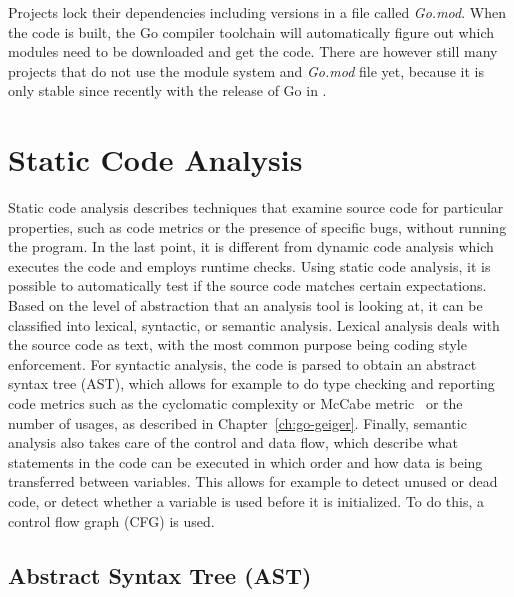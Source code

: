 

Projects lock their dependencies including versions in a file called \textit{Go.mod}.
When the code is built, the Go compiler toolchain will automatically figure out which modules need to be downloaded and
get the code.
There are however still many projects that do not use the module system and \textit{Go.mod} file yet, because it is only
stable since recently with the release of Go  in .



\section{Static Code Analysis}\label{sec:background:static-code-analysis}

Static code analysis describes techniques that examine source code for particular properties, such as code metrics or
the presence of specific bugs, without running the program.
In the last point, it is different from dynamic code analysis which executes the code and employs runtime checks.
Using static code analysis, it is possible to automatically test if the source code matches certain expectations.
Based on the level of abstraction that an analysis tool is looking at, it can be classified into lexical, syntactic,
or semantic analysis.
Lexical analysis deals with the source code as text, with the most common purpose being coding style enforcement.
For syntactic analysis, the code is parsed to obtain an abstract syntax tree (\acrshort{AST}), which allows for example
to do type checking and reporting code metrics such as the cyclomatic complexity or McCabe metric~\cite{watson1996} or
the number of \unsafe{} usages, as described in Chapter~\ref{ch:go-geiger}.
Finally, semantic analysis also takes care of the control and data flow, which describe what statements in the code can
be executed in which order and how data is being transferred between variables.
This allows for example to detect unused or dead code, or detect whether a variable is used before it is initialized.
To do this, a control flow graph (\acrshort{CFG}) is used.



\subsection{Abstract Syntax Tree (AST)}\label{subsec:background:static-code-analysis:ast}


